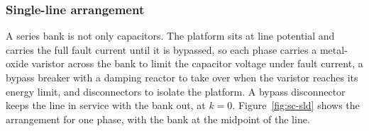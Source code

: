 \subsubsection{Single-line arrangement}
\label{sec:sc-sld}

A series bank is not only capacitors. The platform sits at line potential
and carries the full fault current until it is bypassed, so each phase
carries a metal-oxide varistor across the bank to limit the capacitor
voltage under fault current, a bypass breaker with a damping reactor to take
over when the varistor reaches its energy limit, and disconnectors to
isolate the platform. A bypass disconnector keeps the line in service with
the bank out, at $k = 0$. Figure~\ref{fig:sc-sld} shows the arrangement for
one phase, with the bank at the midpoint of the line.


